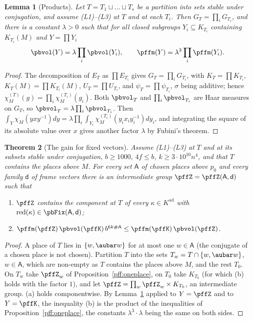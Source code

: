 \documentclass[10pt]{amsart}
\newtheorem{theorem}{Theorem}[section]
\newtheorem{lemma}[theorem]{Lemma}
\theoremstyle{definition}
\theoremstyle{remark}
\begin{document}
\begin{lemma}[Products]\label{pff:products}
Let $T=T_1\sqcup\dots\sqcup T_s$ be a partition into sets stable under conjugation, and assume
(L1)--(L3) at $T$ and at each $T_i$. Then $G_T=\prod_iG_{T_i}$, and there is a constant $\lambda>0$
such that for all closed subgroups $Y_i\subseteq K_{T_i}$ containing $K_{T_i}(M)$ and $Y=\prod Y_i$
\[
\pbvol(Y)=\lambda\prod_i\pbvol(Y_i),\qquad\pffm(Y)=\lambda^3\prod_i\pffm(Y_i).
\]
\end{lemma}
\begin{proof}
The decomposition of $E_T$ as $\prod E_{T_i}$ gives $G_T=\prod_iG_{T_i}$, with $K_T=\prod K_{T_i}$,
$K_T(M)=\prod K_{T_i}(M)$, $U_T=\prod U_{T_i}$, and $\psi_T=\prod\psi_{T_i}$, $\sigma$ being additive;
hence $\chi_{M}^{(T)}(g)=\prod_i\chi_M^{(T_i)}(g_i)$. Both $\pbvol_T$ and $\prod_i\pbvol_{T_i}$ are Haar
measures on $G_T$, so $\pbvol_T=\lambda\prod_i\pbvol_{T_i}$. Then $\int_Y\chi_M(yxy^{-1})dy=\lambda
\prod_i\int_{Y_i}\chi_M^{(T_i)}(y_ix_iy_i^{-1})dy_i$, and integrating the square of its absolute
value over $x$ gives another factor $\lambda$ by Fubini's theorem.
\end{proof}

\begin{theorem}[The gain for fixed vectors]\label{pff:fixed}
Assume (L1)--(L3) at $T$ and at its subsets stable under conjugation, $b\ge1000$, $4f\le b$,
$k\ge3\cdot10^{10}n^4$, and that $T$ contains the places above $M$. For every set $\mathsf A$ of
chosen places above $p_0$ and every family $\mathsf d$ of frame vectors there is an intermediate
group $\pffZ=\pffZ(\mathsf A,\mathsf d)$ such that
\begin{enumerate}
\item[(a)] $\pffZ$ contains the component at $T$ of every $\kappa\in K^{\mathrm{ad}}$ with
$\mathrm{red}(\kappa)\in\pbFix(\mathsf A,\mathsf d)$;
\item[(b)] $\pffm(\pffZ)\,\pbvol(\pffK)\,b^{6k\#\mathsf A}\le\pffm(\pffK)\,\pbvol(\pffZ)$.
\end{enumerate}
\end{theorem}
\begin{proof}
A place of $T$ lies in $\{w,\aubar w\}$ for at most one $w\in\mathsf A$ (the conjugate of a chosen
place is not chosen). Partition $T$ into the sets $T_w=T\cap\{w,\aubar w\}$, $w\in\mathsf A$, which
are non-empty as $T$ contains the places above $M$, and the rest $T_0$. On $T_w$ take $\pffZ_w$ of
Proposition~\ref{pff:oneplace}, on $T_0$ take $K_{T_0}$ (for which (b) holds with the factor $1$),
and let $\pffZ=\prod_w\pffZ_w\times K_{T_0}$, an intermediate group. (a) holds componentwise. By
Lemma~\ref{pff:products} applied to $Y=\pffZ$ and to $Y=\pffK$, the inequality (b) is the product of
the inequalities of Proposition~\ref{pff:oneplace}, the constants $\lambda^3\cdot\lambda$ being the
same on both sides.
\end{proof}
\end{document}
